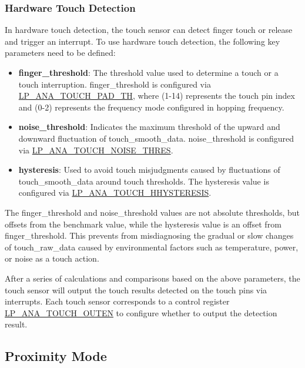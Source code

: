 \documentclass[main\_\_EN.tex]{subfiles}
\begin{document}
\subsubsection{Hardware Touch Detection}

In hardware touch detection, the touch sensor can detect finger touch or release and trigger an interrupt. To use hardware touch detection, the following key parameters need to be defined:

\begin{itemize}
    \item \textbf{finger\_threshold}: The threshold value used to determine a touch or a touch interruption. finger\_threshold is configured via \hyperref[fielddesc:LPANATOUCHPAD0TH0]{LP\_ANA\_TOUCH\_PAD\_TH}, where  (1-14) represents the touch pin index and  (0-2) represents the frequency mode configured in hopping frequency.

    \item \textbf{noise\_threshold}: Indicates the maximum threshold of the upward and downward fluctuation of touch\_smooth\_data. noise\_threshold is configured via \hyperref[fielddesc:LPANATOUCHNOISETHRES]{LP\_ANA\_TOUCH\_NOISE\_THRES}.
    
    \item \textbf{hysteresis}: Used to avoid touch misjudgments caused by fluctuations of touch\_smooth\_data around touch thresholds. The hysteresis value is configured via \hyperref[fielddesc:LPANATOUCHHYSTERESIS]{LP\_ANA\_TOUCH\_HHYSTERESIS}.

\end{itemize}

The finger\_threshold and noise\_threshold values are not absolute thresholds, but offsets from the benchmark value, while the hysteresis value is an offset from finger\_threshold. This prevents from misdiagnosing the gradual or slow changes of touch\_raw\_data caused by environmental factors such as temperature, power, or noise as a touch action.

After a series of calculations and comparisons based on the above parameters, the touch sensor will output the touch results detected on the touch pins via interrupts. Each touch sensor corresponds to a control register \hyperref[fielddesc:LPANATOUCHOUTEN]{LP\_ANA\_TOUCH\_OUTEN} to configure whether to output the detection result.

\subsection{Proximity Mode}
\end{document}
